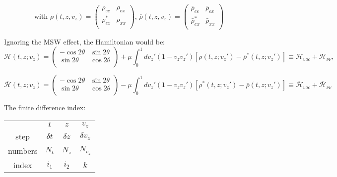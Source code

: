 \documentclass[11pt,a4paper]{article}
\begin{document}
\begin{equation*}
   \text{with } \rho(t,z,v_{z}) = \begin{pmatrix}
      \rho_{ee} & \rho_{ex}\\
      \rho^{*}_{ex} & \rho_{x x}\\
   \end{pmatrix} \text{, }
   \overline{\rho}(t,z,v_{z}) = \begin{pmatrix}
      \bar\rho_{ee} & \bar\rho_{ex}\\
      \bar\rho^{*}_{ex} & \bar\rho_{x x}\\
   \end{pmatrix}
\end{equation*}

\noindent Ignoring the MSW effect, the Hamiltonian would be: 
\begin{equation*}
   \mathcal{H}(t,z;v_z)=
\begin{pmatrix}
 -\cos 2\theta & \sin 2\theta\\
\sin 2\theta & \cos 2\theta \\
\end{pmatrix}
+
\mu \int_0^1 dv_z' (1-v_{z} v_z')
[\rho(t,z;v_z')-\bar\rho^*(t,z;v_z')]
\equiv \mathcal{H}_{vac} + \mathcal{H}_{\nu\nu},
\end{equation*}

\begin{equation*}
   \overline{\mathcal{H}}(t,z;v_z)=
\begin{pmatrix}
   -\cos 2\theta & \sin 2\theta\\
    \sin 2\theta & \cos 2\theta \\
\end{pmatrix}
-
\mu \int_0^1 dv_z' (1-v_{z} v_z')
[\rho^*(t,z;v_z')-\bar\rho(t,z;v_z')]
\equiv \overline{\mathcal{H}}_{vac} + \overline{\mathcal{H}}_{\nu\nu}
\end{equation*}

\noindent The finite difference index:

\begin{center}
   \begin{tabular}{c c c c}
      & $t$ & $z$ & $v_{z}$ \\
      step & $\delta t$ &  $\delta z$ &  $\delta v_{z}$\\
      numbers& $N_{t}$ & $N_{z}$ & $N_{v_{z}}$ \\
      index & $i_1$ & $i_2$ & $k$
   \end{tabular}
\end{center}
\end{document}
